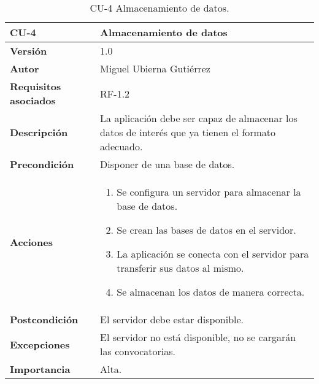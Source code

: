 \begin{table}[p]
	\centering
	\begin{tabularx}{\linewidth}{ p{} p{} }
		\toprule
		\textbf{CU-4}    & \textbf{Almacenamiento de datos}\\
		\toprule
		\textbf{Versión}              & 1.0    \\
		\textbf{Autor}                & Miguel Ubierna Gutiérrez \\
		\textbf{Requisitos asociados} & RF-1.2 \\
		\textbf{Descripción}          & La aplicación debe ser capaz de almacenar los datos de interés que ya tienen el formato adecuado. \\
		\textbf{Precondición}         & Disponer de una base de datos.\\
		\textbf{Acciones}             &
		\begin{enumerate}
			\def\labelenumi{\arabic{enumi}.}
			\tightlist
			\item Se configura un servidor para almacenar la base de datos.
			\item Se crean las bases de datos en el servidor.
                \item La aplicación se conecta con el servidor para transferir sus datos al mismo.
                \item Se almacenan los datos de manera correcta.
		\end{enumerate}\\
		\textbf{Postcondición}        & El servidor debe estar disponible. \\
		\textbf{Excepciones}          & El servidor no está disponible, no se cargarán las convocatorias.  \\
		\textbf{Importancia}          & Alta.  \\
		\bottomrule
	\end{tabularx}
	\caption{CU-4 Almacenamiento de datos.}
\end{table}

